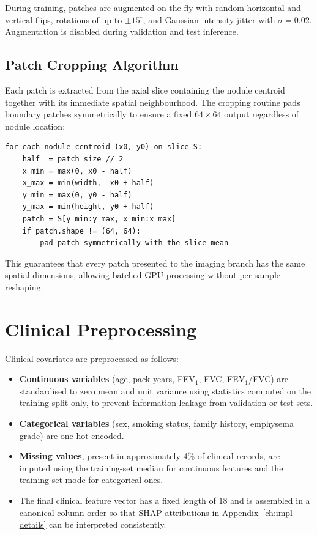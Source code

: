 During training, patches are augmented on-the-fly with random horizontal and
vertical flips, rotations of up to $\pm 15^{\circ}$, and Gaussian intensity
jitter with $\sigma = 0.02$. Augmentation is disabled during validation and
test inference.

\subsection{Patch Cropping Algorithm}
\label{sec:patch-crop}

Each patch is extracted from the axial slice containing the nodule centroid
together with its immediate spatial neighbourhood. The cropping routine pads
boundary patches symmetrically to ensure a fixed $64 \times 64$ output
regardless of nodule location:

\begin{verbatim}
for each nodule centroid (x0, y0) on slice S:
    half  = patch_size // 2
    x_min = max(0, x0 - half)
    x_max = min(width,  x0 + half)
    y_min = max(0, y0 - half)
    y_max = min(height, y0 + half)
    patch = S[y_min:y_max, x_min:x_max]
    if patch.shape != (64, 64):
        pad patch symmetrically with the slice mean
\end{verbatim}

This guarantees that every patch presented to the imaging branch has the same
spatial dimensions, allowing batched GPU processing without per-sample
reshaping.

\section{Clinical Preprocessing}
\label{sec:clinical-preproc}

Clinical covariates are preprocessed as follows:

\begin{itemize}
    \item \textbf{Continuous variables} (age, pack-years, FEV$_1$, FVC,
          FEV$_1$/FVC) are standardised to zero mean and unit variance using
          statistics computed on the training split only, to prevent
          information leakage from validation or test sets.
    \item \textbf{Categorical variables} (sex, smoking status, family history,
          emphysema grade) are one-hot encoded.
    \item \textbf{Missing values}, present in approximately 4\% of clinical
          records, are imputed using the training-set median for continuous
          features and the training-set mode for categorical ones.
    \item The final clinical feature vector has a fixed length of $18$ and is
          assembled in a canonical column order so that SHAP attributions in
          Appendix~\ref{ch:impl-details} can be interpreted consistently.
\end{itemize}

